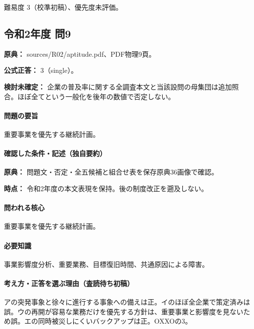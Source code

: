 \par 難易度 3（校準初稿）、優先度未評価。

\subsection{令和2年度 問9}
\label{q:r02-reg-apt-09}

\noindent\textbf{原典：} sources/R02/aptitude.pdf、PDF物理9頁。

\textbf{公式正答：} 3（single）。

\par\textbf{検討未確定：} 企業の普及率に関する全調査本文と当該設問の母集団は追加照合。ほぼ全てという一般化を後年の数値で否定しない。

\paragraph{問題の要旨} 重要事業を優先する継続計画。

\paragraph{確認した条件・記述（独自要約）}\mbox{}\par

\noindent\textbf{原典：} 問題文・否定・全五候補と組合せ表を保存原典36画像で確認。\par

\noindent\textbf{時点：} 令和2年度の本文表現を保持。後の制度改正を遡及しない。\par

\paragraph{問われる核心} 重要事業を優先する継続計画。

\paragraph{必要知識} 事業影響度分析、重要業務、目標復旧時間、共通原因による障害。

\paragraph{考え方・正答を選ぶ理由（査読待ち初稿）} アの突発事象と徐々に進行する事象への備えは正。イのほぼ全企業で策定済みは誤。ウの再開が容易な業務だけを優先する方針は、重要事業と影響度を見ないため誤。エの同時被災しにくいバックアップは正。OXXOの3。

